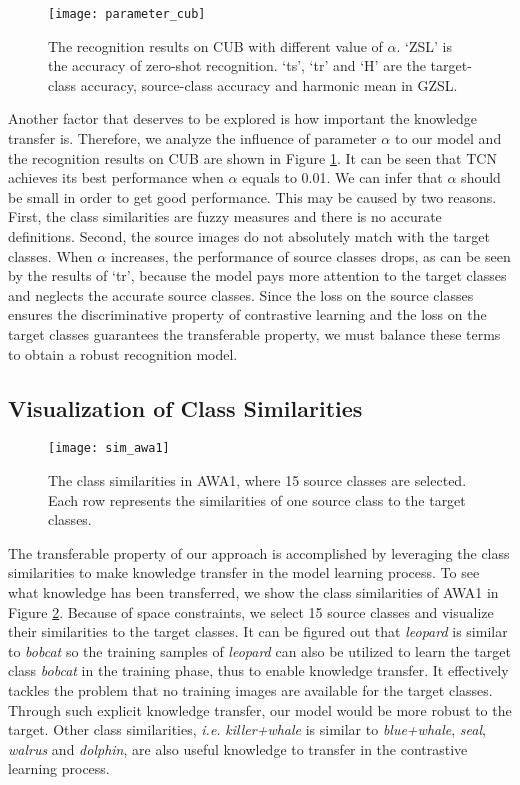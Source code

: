 \documentclass[10pt,twocolumn,letterpaper]{article}
\begin{document}
\begin{figure}[t]
\centering
\texttt{[image: parameter\_cub]}
\caption{The recognition results on CUB with different value of $\alpha$. `ZSL' is the accuracy of zero-shot recognition. `ts', `tr' and `H' are the target-class accuracy, source-class accuracy and harmonic mean in GZSL. }
\label{fig:parameter}
\end{figure}

Another factor that deserves to be explored is how important the knowledge transfer is. Therefore, we analyze the influence of parameter $\alpha$ to our model and the recognition results on CUB are shown in Figure \ref{fig:parameter}. It can be seen that TCN achieves its best performance when $\alpha$ equals to 0.01. We can infer that $\alpha$ should be small in order to get good performance. This may be caused by two reasons. First, the class similarities are fuzzy measures and there is no accurate definitions. Second, the source images do not absolutely match with the target classes. When $\alpha$ increases, the performance of source classes drops, as can be seen by the results of `tr', because the model pays more attention to the target classes and neglects the accurate source classes. Since the loss on the source classes ensures the discriminative property of contrastive learning and the loss on the target classes guarantees the transferable property, we must balance these terms to obtain a robust recognition model.


\subsection{Visualization of Class Similarities}
\begin{figure}[t]
\centering
\texttt{[image: sim\_awa1]}
\caption{The class similarities in AWA1, where 15 source classes are selected. Each row represents the similarities of one source class to the target classes.}
\label{fig:sim_awa}
\end{figure}

The transferable property of our approach is accomplished by leveraging the class similarities to make knowledge transfer in the model learning process. To see what knowledge has been transferred, we show the class similarities of AWA1 in Figure \ref{fig:sim_awa}. Because of space constraints, we select 15 source classes and visualize their similarities to the target classes. It can be figured out that \emph{leopard} is similar to \emph{bobcat} so the training samples of \emph{leopard} can also be utilized to learn the target class \emph{bobcat} in the training phase, thus to enable knowledge transfer. It effectively tackles the problem that no training images are available for the target classes. Through such explicit knowledge transfer, our model would be more robust to the target. Other class similarities, \emph{i.e.} \emph{killer+whale} is similar to \emph{blue+whale}, \emph{seal}, \emph{walrus} and \emph{dolphin}, are also useful knowledge to transfer in the contrastive learning process.
\end{document}
